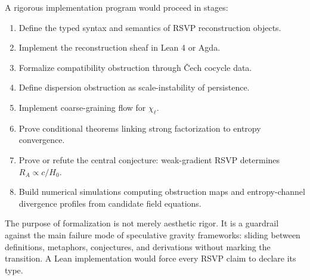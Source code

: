 \documentclass[11pt, a4paper]{article}
\theoremstyle{plain}
\theoremstyle{definition}
\theoremstyle{remark}
\newcommand{\RA}{R_{\!A}}
\begin{document}
A rigorous implementation program would proceed in stages:
\begin{enumerate}[label=(\arabic*)]
  \item Define the typed syntax and semantics of RSVP reconstruction objects.
  \item Implement the reconstruction sheaf in Lean 4 or Agda.
  \item Formalize compatibility obstruction through \v{C}ech cocycle data.
  \item Define dispersion obstruction as scale-instability of persistence.
  \item Implement coarse-graining flow for $\chi_\ell$.
  \item Prove conditional theorems linking strong factorization to entropy convergence.
  \item Prove or refute the central conjecture: weak-gradient RSVP determines
    $\RA \propto c/H_0$.
  \item Build numerical simulations computing obstruction maps and entropy-channel
    divergence profiles from candidate field equations.
\end{enumerate}

The purpose of formalization is not merely aesthetic rigor. It is a guardrail against
the main failure mode of speculative gravity frameworks: sliding between definitions,
metaphors, conjectures, and derivations without marking the transition. A Lean
implementation would force every RSVP claim to declare its type.

\newpage
\end{document}
